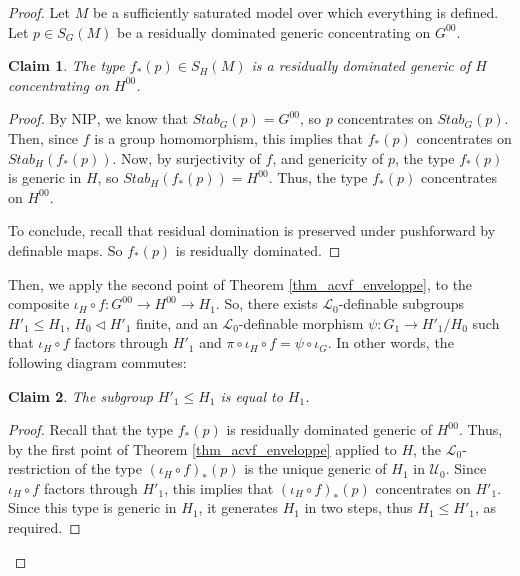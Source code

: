 \documentclass[10pt,a4paper]{amsart}
\newtheorem{claim}{Claim}
\newcommand{\NIP}{\mathrm{NIP}}
\newcommand{\Ualg}{\mathcal{U}_0}
\begin{document}
\begin{proof}
\setcounter{claim}{0}
    Let $M$ be a sufficiently saturated model over which everything is defined. Let $p \in S_G(M)$ be a residually dominated generic concentrating on $G^{00}$.
    \begin{claim}
        The type $f_*(p) \in S_H(M)$ is a residually dominated generic of $H$ concentrating on $H^{00}$.
    \end{claim}
    \begin{proof}
        By $\NIP$, we know that $Stab_G(p)=G^{00}$, so $p$ concentrates on $Stab_G(p)$. Then, since $f$ is a group homomorphism, this implies that $f_*(p)$ concentrates on $Stab_H(f_*(p))$. Now, by surjectivity of $f$, and genericity of $p$, the type $f_*(p)$ is generic in $H$, so $Stab_H(f_*(p))=H^{00}$. Thus, the type $f_*(p)$ concentrates on $H^{00}$.

        To conclude, recall that residual domination is preserved under pushforward by definable maps. So $f_*(p)$ is residually dominated.
    \end{proof}

    Then, we apply the second point of Theorem \ref{thm_acvf_enveloppe}, to the composite $\iota_H \circ f: G^{00} \rightarrow H^{00} \rightarrow H_1$. So, there exists $\mathcal{L}_0$-definable subgroups $H'_1 \leq H_1$, $H_0 \lhd H'_1$ finite, and an $\mathcal{L}_0$-definable morphism $\psi: G_1 \rightarrow H'_1/H_0$ such that $\iota_H \circ f$ factors through $H'_1$ and $\pi \circ \iota_H \circ f = \psi \circ \iota_G$. In other words, the following diagram commutes:

    
\begin{center}
\end{center}

\begin{claim}
    The subgroup $H'_1 \leq H_1$ is equal to $H_1$.
\end{claim}
\begin{proof}
    Recall that the type $f_*(p)$ is residually dominated generic of $H^{00}$. Thus, by the first point of Theorem \ref{thm_acvf_enveloppe} applied to $H$, the $\mathcal{L}_0$-restriction of the type ${(\iota_H \circ f)}_*(p)$ is the unique generic of $H_1$ in $\Ualg$. Since $\iota_H \circ f$ factors through $H'_1$, this implies that ${(\iota_H \circ f)}_*(p)$ concentrates on $H'_1$. Since this type is generic in $H_1$, it generates $H_1$ in two steps, thus $H_1 \leq H'_1$, as required.
\end{proof}


\end{proof}
\end{document}
